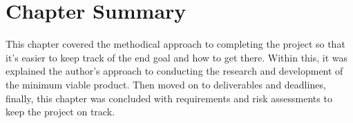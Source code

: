 \section{Chapter Summary}

This chapter covered the methodical approach to completing the project so that it's easier to keep track of the end goal and how to get there. Within this, it was explained the author's approach to conducting the research and development of the minimum viable product. Then moved on to deliverables and deadlines, finally, this chapter was concluded with requirements and risk assessments to keep the project on track.